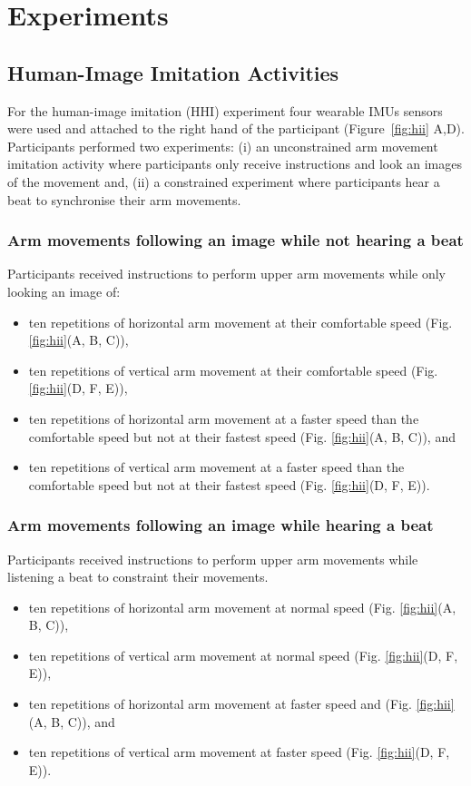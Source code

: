 \section{Experiments}

\subsection{Human-Image Imitation Activities}

For the human-image imitation (HHI) experiment four wearable IMUs sensors 
were used and attached to the right hand of the participant 
(Figure~\ref{fig:hii} A,D). 
Participants performed two experiments: 
(i) an unconstrained arm movement imitation activity
where participants only receive instructions and look an images 
of the movement and,
(ii) a constrained experiment where participants hear a beat 
to synchronise their arm movements.


\subsubsection{Arm movements following an image while not hearing a beat}

Participants received instructions to perform upper arm 
movements while only looking an image of: 
\begin{itemize}[noitemsep,topsep=0pt]
\item ten repetitions of horizontal arm movement at their comfortable speed
(Fig. \ref{fig:hii}(A, B, C)), 
\item ten repetitions of vertical arm movement at their comfortable speed 
(Fig. \ref{fig:hii}(D, F, E)),
\item ten repetitions of horizontal arm movement at a faster speed than 
the comfortable speed but not at their fastest speed 
(Fig. \ref{fig:hii}(A, B, C)), and 
\item ten repetitions of vertical arm movement at a faster speed than the 
comfortable speed but not at their fastest speed
(Fig. \ref{fig:hii}(D, F, E)).
\end{itemize}

\subsubsection{Arm movements following an image while hearing a beat}

Participants received instructions to perform upper arm movements while 
listening a beat to constraint their movements. 
\begin{itemize}[noitemsep,topsep=0pt]
\item ten repetitions of horizontal arm movement at normal speed
(Fig. \ref{fig:hii}(A, B, C)), 
\item ten repetitions of vertical arm movement at normal speed
(Fig. \ref{fig:hii}(D, F, E)), 
\item ten repetitions of horizontal arm movement at faster speed and
(Fig. \ref{fig:hii}(A, B, C)), and 
\item ten repetitions of vertical arm movement at faster speed
(Fig. \ref{fig:hii}(D, F, E)).
\end{itemize}



